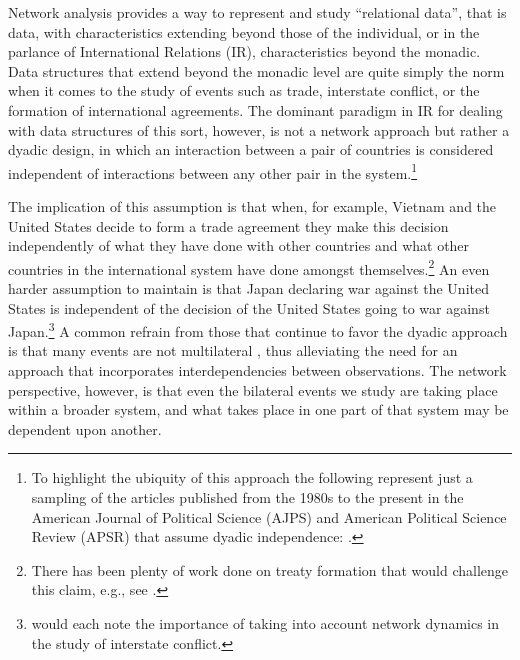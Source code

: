 Network analysis provides a way to represent and study ``relational data'', that is data, with characteristics extending beyond those of the individual, or in the parlance of International Relations (IR), characteristics beyond the monadic. Data structures that extend beyond the monadic level are quite simply the norm when it comes to the study of events such as trade, interstate conflict, or the formation of international agreements. The dominant paradigm in IR for dealing with data structures of this sort, however, is not a network approach but rather a dyadic design, in which an interaction between a pair of countries is considered independent of interactions between any other pair in the system.\footnote{To highlight the ubiquity of this approach the following represent just a sampling of the articles published from the 1980s to the present in the American Journal of Political Science (AJPS) and American Political Science Review (APSR) that assume dyadic independence: \citet{dixon:1983,mansfield:etal:2000,lemke:reed:2001a,mitchell:2002,dafoe:2011a,fuhrmann:sechser:2014,carnegie:2014}.} 

The implication of this assumption is that when, for example, Vietnam and the United States decide to form a trade agreement they make this decision independently of what they have done with other countries and what other countries in the international system have done amongst themselves.\footnote{There has been plenty of work done on treaty formation that would challenge this claim, e.g., see \citet{manger:etal:2012,kinne:2013}.} An even harder assumption to maintain is that Japan declaring war against the United States is independent of the decision of the United States going to war against Japan.\footnote{\citet{maoz:etal:2006,ward:etal:2007,minhas:etal:2016} would each note the importance of taking into account network dynamics in the study of interstate conflict.} A common refrain from those that continue to favor the dyadic approach is that many events are not multilateral \citep{diehl:wright:2016}, thus alleviating the need for an approach that incorporates interdependencies between observations. The network perspective, however, is that even the bilateral events we study are taking place within a broader system, and what takes place in one part of that system may be dependent upon another. 




